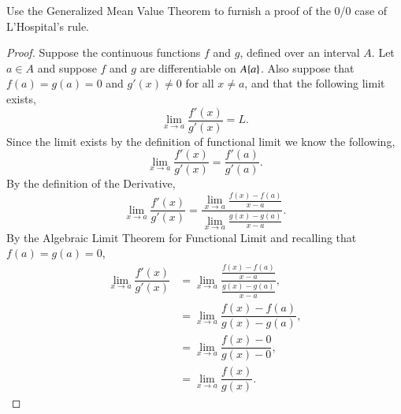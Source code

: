 \documentclass[12pt]{article}
\makeatletter
\theoremstyle{homework}
\newenvironment{exercise}[1]
{\def\@currentlabel{#1}\exercisecore}
{\endexercisecore}
\makeatother
\begin{document}
\begin{exercise}{Abbott 5.3.11(a)} Use the Generalized Mean Value Theorem to furnish a proof of the 0/0 case of 
  L'Hospital's rule.\\

  \begin{proof}
    Suppose the continuous functions $f$ and $g$, defined over an interval $A$. Let $a \in A$ and suppose $f$ and 
    $g$ are differentiable on $A\/\{a\}$. Also suppose that $f(a) = g(a) = 0$ and $g'(x) \neq 0$ for all $x\neq a$, and that the following limit exists,
    \begin{equation*}
      \lim_{x \to a} \dfrac{f'(x)}{g'(x)} = L.
    \end{equation*}
     Since the limit exists by the definition of functional limit we know the following,
     \begin{equation*}
      \lim_{x \to a} \dfrac{f'(x)}{g'(x)} = \dfrac{f'(a)}{g'(a)}.
     \end{equation*}
     By the definition of the Derivative,
     \begin{equation*}
      \lim_{x \to a} \dfrac{f'(x)}{g'(x)} = \dfrac{\lim_{x \to a}\frac{f(x) - f(a)}{x - a}}{\lim_{x \to a}\frac{g(x) - g(a)}{x - a}}.
     \end{equation*} 
     By the Algebraic Limit Theorem for Functional Limit and recalling that $f(a) = g(a) = 0$,
     \begin{align*}
      \lim_{x \to a} \dfrac{f'(x)}{g'(x)} &= \lim_{x \to a}\dfrac{\frac{f(x) - f(a)}{x - a}}{\frac{g(x) - g(a)}{x - a}},\\
       &= \lim_{x \to a}\dfrac{f(x) - f(a)}{g(x) - g(a)},\\
       &= \lim_{x \to a}\dfrac{f(x) - 0}{g(x) - 0},\\
       &= \lim_{x \to a}\dfrac{f(x)}{g(x)}.
     \end{align*} 
  \end{proof}
\end{exercise}
\vspace{.5in}
\end{document}
